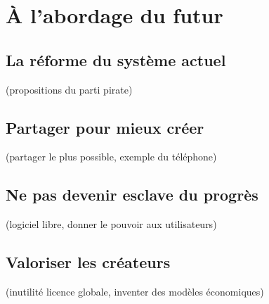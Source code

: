 \chapter{À l'abordage du futur}

\section{La réforme du système actuel}
(propositions du parti pirate)
\section{Partager pour mieux créer}
(partager le plus possible, exemple du téléphone)
\section{Ne pas devenir esclave du progrès}
(logiciel libre, donner le pouvoir aux utilisateurs)
\section{Valoriser les créateurs}
(inutilité licence globale, inventer des modèles économiques)
